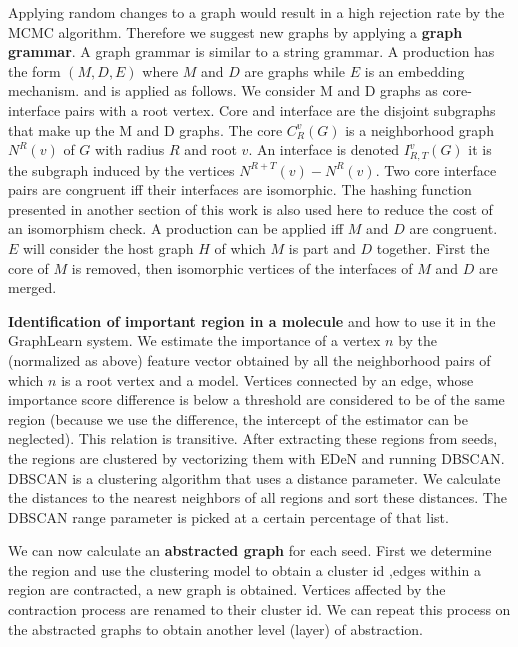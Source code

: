 \documentclass{article}
\begin{document}
Applying random changes to a graph would result in a high rejection rate by the MCMC 
algorithm. Therefore we suggest new graphs by applying a \textbf{graph grammar}. 
A graph grammar is similar to a string grammar. A production has the form $(M,D,E)$ 
where $M$ and $D$ are graphs while $E$ is an embedding mechanism.
and is applied as follows. 
We consider M and D graphs as core-interface pairs with a root vertex. 
Core and interface are the disjoint subgraphs that make up the M and D graphs. 
The core $C^v_R(G)$ is a neighborhood graph $N^R(v)$ of $G$ with radius $R$ and root $v$.
An interface is denoted $I^v_{R,T}(G)$ it is the subgraph induced by the vertices $N^{R+T}(v) - 
N^{R}(v)$. Two core interface pairs are congruent iff 
their interfaces are isomorphic. The hashing function presented in another section 
of this work is also used here to reduce the cost of an isomorphism check. 
A production can be applied iff $M$ and $D$ are congruent. $E$ will consider the 
host graph $H$ of which $M$ is part and $D$ together. First the core of $M$ is removed,
then isomorphic vertices of the interfaces of $M$ and $D$ are merged.


\textbf{Identification of important region in a molecule} and how to use it in the GraphLearn
system. We estimate the importance of a vertex $n$ by the (normalized as above) feature vector 
obtained by all the neighborhood pairs of which $n$ is a root vertex and a model.
Vertices connected by an edge, whose importance score difference is below a threshold are considered
to be of the same region (because we use the difference, the intercept of the estimator can
be neglected). This relation is transitive. After extracting these regions from seeds, 
the regions are clustered by vectorizing them with EDeN and running DBSCAN. 
DBSCAN is a clustering algorithm that uses a distance parameter. We calculate the distances to the 
nearest neighbors of all regions and sort these distances. The DBSCAN range parameter is 
picked at a certain percentage of that list. 

We can now calculate an \textbf{abstracted graph} for each seed. 
First we determine the region and use the clustering model to obtain a cluster id
,edges within a region are contracted, a new graph is
obtained. Vertices affected by the contraction process are renamed to their cluster id.
We can repeat this process on the abstracted graphs to obtain another level (layer) of abstraction.
\end{document}
